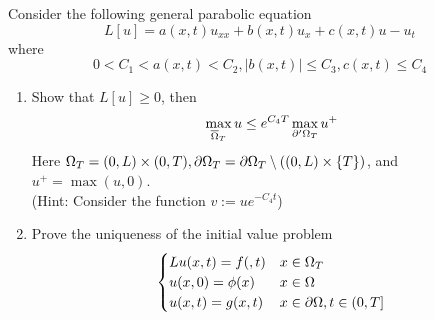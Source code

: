 Consider the following general parabolic equation
$$
L[u] = a(x, t) u_{xx} + b(x, t) u_x + c(x, t) u - u_t
$$
where
$$
0 < C_1 < a(x, t) < C_2, |b(x, t)| \leq C_3, c(x, t) \leq C_4
$$
\begin{enumerate}
\item
  Show that $L[u] \geq 0$, then
  $$
  \max \limits_{\overline{\Omega}_T} u \leq e^{C_4 T} \max \limits_{\partial' \Omega_T} u^+
  $$
  Here $\Omega_T = (0, L) \times (0, T), \partial \Omega_T = \partial \Omega_T \setminus ((0, L) \times \{ T \})$, and $u^+ = \max(u, 0)$.\\
  (Hint: Consider the function $v := u e^{-C_4 t}$)
\item
  Prove the uniqueness of the initial value problem
  $$
  \begin{cases}
    L u(x, t) = f(, t) & x \in \Omega_T\\
    u(x, 0) = \phi(x) & x \in \Omega\\
    u(x, t) = g(x, t) & x \in \partial \Omega, t \in (0, T]
  \end{cases}
  $$
\end{enumerate}
